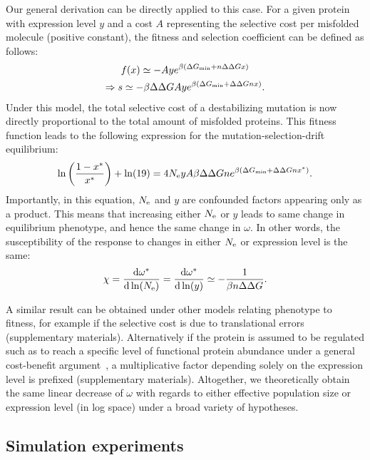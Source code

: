 Our general derivation can be directly applied to this case.
For a given protein with expression level $y$ and a cost $A$ representing the selective cost per misfolded molecule (positive constant), the fitness and selection coefficient can be defined as follows:
\begin{gather}
    f (x) \simeq - A y e^{\beta (\Delta G_{\text{min}} + n \Delta \Delta G x)} \\
    \Rightarrow s \simeq - \beta \Delta \Delta G A y e^{\beta(\Delta G_{\text{min}} + \Delta \Delta G n x)}.
\end{gather}
Under this model, the total selective cost of a destabilizing mutation is now directly proportional to the total amount of misfolded proteins.
This fitness function leads to the following expression for the mutation-selection-drift equilibrium:
\begin{equation}
    \ln \left( \frac{1 - x^{*}}{x^{*}} \right) + \ln (19) = 4N_{\text{e}} y A \beta \Delta \Delta G n e^{\beta(\Delta G_{\text{min}} + \Delta \Delta G n x^{*})}.
\end{equation}
Importantly, in this equation, $N_{\text{e}}$ and $y$ are confounded factors appearing only as a product.
This means that increasing either $N_{\text{e}}$ or $y$ leads to same change in equilibrium {phenotype}, and hence the same change in $\omega$.
In other words, the susceptibility of the response to changes in either $N_{\text{e}}$ or expression level is the same:
\begin{align}
    \chi = \frac{ \der \omega\eq}{\der \ln (\Ne)} = \frac{ \der \omega\eq}{\der \ln (y)} \simeq - \frac{1}{\beta \NbrSites \EmpiricalDeltaDeltaG}. \label{eq:chi_application_y}
\end{align}

A similar result can be obtained under other models relating {phenotype} to fitness, for example if the selective cost is due to translational errors (supplementary materials).
Alternatively if the protein is assumed to be regulated such as to reach a specific level of functional protein abundance under a general cost-benefit argument~\citep{Cherry2010,Gout2010}, a multiplicative factor depending solely on the expression level is prefixed (supplementary materials).
Altogether, we theoretically obtain the same linear decrease of $\omega$ with regards to either {effective population size} or expression level (in log space) under a broad variety of hypotheses.

\subsection{Simulation experiments}

